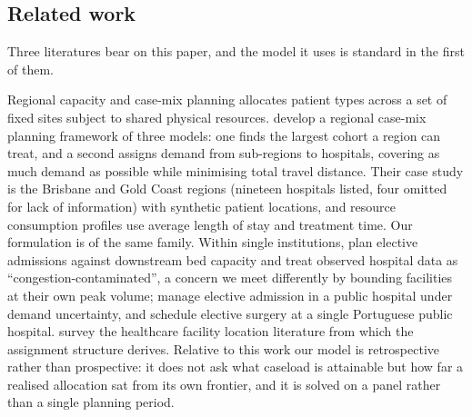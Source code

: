 \subsection{Related work}
\label{sec:related}

Three literatures bear on this paper, and the model it uses is standard in the
first of them.

Regional capacity and case-mix planning allocates patient types across a set of
fixed sites subject to shared physical resources. \citet{burdett2023} develop
a regional case-mix planning framework of three models: one finds the largest cohort a region can treat,
and a second assigns demand from sub-regions to hospitals, covering as much demand as possible while minimising
total travel distance. Their case study is the Brisbane and Gold Coast regions (nineteen hospitals listed, four omitted for
lack of information) with synthetic patient locations, and resource consumption profiles use average length of stay
and treatment time. Our formulation is of the same family. Within single institutions, \citet{helm2014} plan elective
admissions against downstream bed capacity and treat observed hospital data as
``congestion-contaminated'', a concern we meet differently by bounding facilities at
their own peak volume; \citet{meng2015} manage elective admission in
a public hospital under demand uncertainty, and \citet{marques2014} schedule
elective surgery at a single Portuguese public hospital.
\citet{ahmadijavid2017} survey the healthcare facility location literature from
which the assignment structure derives. Relative to this work our model is
retrospective rather than prospective: it does not ask what caseload is
attainable but how far a realised allocation sat from its own frontier, and it
is solved on a panel rather than a single planning period.


